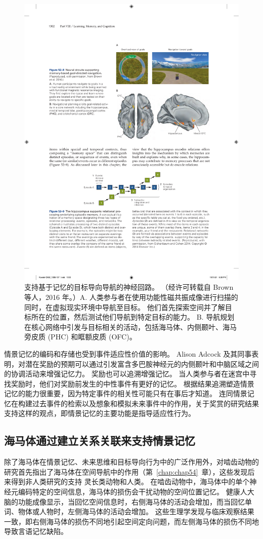 \begin{figure}[htbp]
	\centering
	\includegraphics[width=0.7\linewidth]{chap52/fig_52_8}
	\caption{支持基于记忆的目标导向导航的神经回路。 （经许可转载自 Brown 等人，2016 年。）A. 人类参与者在使用功能性磁共振成像进行扫描的同时，在虚拟现实环境中导航至目标。 他们首先探索空间并了解目标所在的位置，然后测试他们导航到特定目标的能力。 B. 导航规划在核心网络中引发与目标相关的活动，包括海马体、内侧颞叶、海马旁皮质 (PHC) 和眶额皮质 (OFC)。}
	\label{fig:52_8}
\end{figure}


情景记忆的编码和存储也受到事件适应性价值的影响。
Alison Adcock 及其同事表明，对潜在奖励的预期可以通过引发富含多巴胺神经元的内侧颞叶和中脑区域之间的协调活动来增强记忆力。
奖励也可以追溯增强记忆。
当人类参与者在迷宫中寻找奖励时，他们对奖励前发生的中性事件有更好的记忆。
根据结果追溯塑造情景记忆的能力很重要，因为特定事件的相关性可能只有在事后才知道。
连同情景记忆在构建过去事件的检索以及想象和模拟未来事件中的作用，关于奖赏的研究结果支持这样的观点，即情景记忆的主要功能是指导适应性行为。



\subsection{海马体通过建立关系关联来支持情景记忆}

除了海马体在情景记忆、未来思维和目标导向行为中的广泛作用外，对啮齿动物的研究首先指出了海马体在空间导航中的作用（第~\ref{chap:chap54}~章），这些发现后来得到非人类研究的支持 灵长类动物和人类。
在啮齿动物中，海马体中的单个神经元编码特定的空间信息，海马体的损伤会干扰动物的空间位置记忆。
健康人大脑的功能成像显示，当回忆空间信息时，右侧海马体的活动会增加，而当回忆单词、物体或人物时，左侧海马体的活动会增加。
这些生理学发现与临床观察结果一致，即右侧海马体的损伤不同地引起空间定向问题，而左侧海马体的损伤不同地导致言语记忆缺陷。


